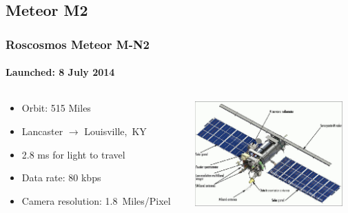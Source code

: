 \documentclass[]{beamer}
\begin{document}
\subsection{Meteor M2}
\begin{frame}
    \frametitle{Roscosmos Meteor M-N2}
    \framesubtitle{Launched: 8 July 2014}
    \begin{columns}[T]
        \begin{column}[T]{5.5cm}
            \begin{itemize}
                \item Orbit: 515 Miles
                \item Lancaster $\to$ Louisville,~KY
                \item 2.8 ms for light to travel
                \item Data rate: 80 kbps
                \item Camera resolution: 1.8~Miles/Pixel
            \end{itemize}
        \end{column}
        \begin{column}[T]{5cm}
            \includegraphics[height=4cm,keepaspectratio]{images/meteor-m2.jpg}
        \end{column}
    \end{columns}
\end{frame}
\end{document}
